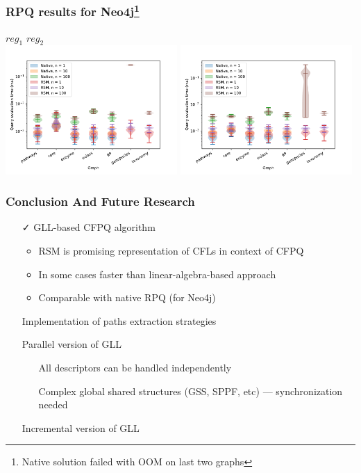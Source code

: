 \documentclass[xcolor=table,aspectratio=169]{beamer}
\begin{document}
\begin{frame}[fragile] \frametitle{RPQ results for Neo4j\footnote{Native solution failed with OOM on last two graphs}}
  \begin{center}
    $\textit{reg}_1$ \hspace{7cm} $\textit{reg}_2$     \\
    \includegraphics[width=0.49\textwidth]{pictures/reg1_rpq_result.pdf}
    \includegraphics[width=0.49\textwidth]{pictures/reg2_rpq_result.pdf}
  \end{center}
\end{frame}

\begin{frame}[fragile] \frametitle{Conclusion And Future Research}
  \begin{itemize}
      \item[\faCheck] GLL-based CFPQ algorithm 
      \begin{itemize}
         \item RSM is promising representation of CFLs in context of CFPQ
         \item In some cases faster than linear-algebra-based approach
         \item Comparable with native RPQ (for Neo4j)
      \end{itemize}
      \item[\faGears] Implementation of paths extraction strategies
      \item[\faHourglassStart] Parallel version of GLL
      \begin{itemize}
         \item[\faLightbulbO] All descriptors can be handled independently
         \item[\faFrownO] Complex global shared structures (GSS, SPPF, etc) --- synchronization needed
      \end{itemize}      
      \item[\faHourglassStart] Incremental version of GLL
  \end{itemize}
\end{frame}
\end{document}
